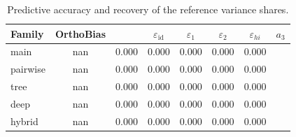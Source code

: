 \begin{table}[t]\centering\small
\caption{Predictive accuracy and recovery of the reference variance shares.}
\begin{tabular}{lcccccc}
\toprule
Family & OrthoBias &  & $\varepsilon_{\mathrm{id}}$ & $\varepsilon_{1}$ & $\varepsilon_{2}$ & $\varepsilon_{hi}$ & $a_3$ \\
\midrule
main & nan & 0.000 & 0.000 & 0.000 & 0.000 & 0.000 \\
pairwise & nan & 0.000 & 0.000 & 0.000 & 0.000 & 0.000 \\
tree & nan & 0.000 & 0.000 & 0.000 & 0.000 & 0.000 \\
deep & nan & 0.000 & 0.000 & 0.000 & 0.000 & 0.000 \\
hybrid & nan & 0.000 & 0.000 & 0.000 & 0.000 & 0.000 \\
\bottomrule\end{tabular}\end{table}
